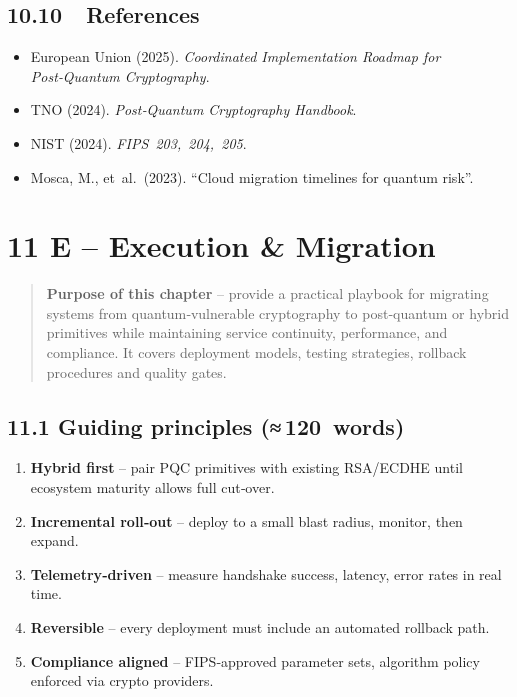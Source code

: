 \documentclass[
  english,
]{article}
\providecommand{\tightlist}{%
  \setlength{\itemsep}{0pt}\setlength{\parskip}{0pt}}
\begin{document}
\subsection{10.10~~References}\label{references-2}

\begin{itemize}
\tightlist
\item
  European Union (2025). \emph{Coordinated Implementation Roadmap for
  Post‑Quantum Cryptography}.
\item
  TNO (2024). \emph{Post‑Quantum Cryptography Handbook}.
\item
  NIST (2024). \emph{FIPS~203,~204,~205}.
\item
  Mosca, M., et~al.~(2023). ``Cloud migration timelines for quantum
  risk''.
\end{itemize}

\section{11 E -- Execution \& Migration}\label{e-execution-migration-1}

\begin{quote}
\textbf{Purpose of this chapter} -- provide a practical playbook for
migrating systems from quantum‑vulnerable cryptography to post‑quantum
or hybrid primitives while maintaining service continuity, performance,
and compliance. It covers deployment models, testing strategies,
rollback procedures and quality gates.
\end{quote}

\subsection{11.1 Guiding principles
(≈\,120~words)}\label{guiding-principles-120-words}

\begin{enumerate}
\def\labelenumi{\arabic{enumi}.}
\tightlist
\item
  \textbf{Hybrid first} -- pair PQC primitives with existing RSA/ECDHE
  until ecosystem maturity allows full cut‑over.
\item
  \textbf{Incremental roll‑out} -- deploy to a small blast radius,
  monitor, then expand.
\item
  \textbf{Telemetry‑driven} -- measure handshake success, latency, error
  rates in real time.
\item
  \textbf{Reversible} -- every deployment must include an automated
  rollback path.
\item
  \textbf{Compliance aligned} -- FIPS‑approved parameter sets, algorithm
  policy enforced via crypto providers.
\end{enumerate}
\end{document}
